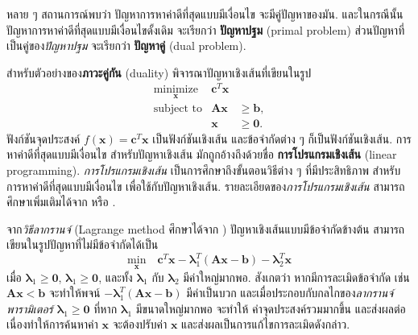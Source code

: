\begin{Exercise}
	\label{ex: opt duality}
	
หลาย ๆ สถานการณ์พบว่า 
ปัญหาการหาค่าดีที่สุดแบบมีเงื่อนไข จะมีคู่ปัญหาของมัน.
และในกรณีนั้น
ปัญหาการหาค่าดีที่สุดแบบมีเงื่อนไขดั้งเดิม จะเรียกว่า \textbf{ปัญหาปฐม} (primal problem)
ส่วนปัญหาที่เป็นคู่ของ\textit{ปัญหาปฐม} จะเรียกว่า \textbf{ปัญหาคู่} (dual problem).

สำหรับตัวอย่างของ\textbf{ภาวะคู่กัน} (duality) 
พิจารณาปัญหาเชิงเส้นที่เขียนในรูป
\begin{eqnarray}
\underset{\bm{x}}{\mathrm{minimize}} & \bm{c}^T \bm{x} & 
\nonumber \\
\mbox{subject to} & \bm{A} \bm{x} & \geq \bm{b}, 
\nonumber \\
& \bm{x}        & \geq \bm{0}.
\nonumber
\end{eqnarray}
ฟังก์ชันจุดประสงค์ $f(\bm{x}) = \bm{c}^T \bm{x}$ เป็นฟังก์ชันเชิงเส้น
และข้อจำกัดต่าง ๆ ก็เป็นฟังก์ชันเชิงเส้น.
การหาค่าดีที่สุดแบบมีเงื่อนไข สำหรับปัญหาเชิงเส้น มักถูกอ้างถึงด้วยชื่อ \textbf{การโปรแกรมเชิงเส้น} (linear programming).
\textit{การโปรแกรมเชิงเส้น} เป็นการศึกษาถึงขั้นตอนวิธีต่าง ๆ ที่มีประสิทธิภาพ สำหรับการหาค่าดีที่สุดแบบมีเงื่อนไข เพื่อใช้กับปัญหาเชิงเส้น.
รายละเอียดของ\textit{การโปรแกรมเชิงเส้น} สามารถศึกษาเพิ่มเติมได้จาก \cite{ChongZak2ndEd} หรือ \cite{NashSofer1996}.

จาก\textit{วิธีลากรานจ์} (Lagrange method ศึกษาได้จาก \cite{ChongZak2ndEd})
ปัญหาเชิงเส้นแบบมีข้อจำกัดข้างต้น สามารถเขียนในรูปปัญหาที่ไม่มีข้อจำกัดได้เป็น
\[
\underset{\bm{x}}{\mathrm{min}} \quad \bm{c}^T \bm{x} 
- \bm{\lambda}_1^T (\bm{A} \bm{x} - \bm{b})
- \bm{\lambda}_2^T \bm{x}
\]
เมื่อ $\bm{\lambda}_1 \geq \bm{0}$, $\bm{\lambda}_1 \geq \bm{0}$, 
และทั้ง $\bm{\lambda}_1$ กับ $\bm{\lambda}_2$ มีค่าใหญ่มากพอ. 
สังเกตว่า หากมีการละเมิดข้อจำกัด เช่น $\bm{A} \bm{x} < \bm{b}$ จะทำให้พจน์ $- \bm{\lambda}_1^T (\bm{A} \bm{x} - \bm{b})$ มีค่าเป็นบวก 
และเมื่อประกอบกับกลไกของ\textit{ลากรานจ์พารามิเตอร์} $\bm{\lambda}_1 \geq \bm{0}$ ที่หาก $\bm{\lambda}_1$ มีขนาดใหญ่มากพอ
จะทำให้ ค่าจุดประสงค์รวมมากขึ้น และส่งผลต่อเนื่องทำให้การค้นหาค่า $\bm{x}$ จะต้องปรับค่า $\bm{x}$ 
และส่งผลเป็นการแก้ไขการละเมิดดังกล่าว.


\end{Exercise}
